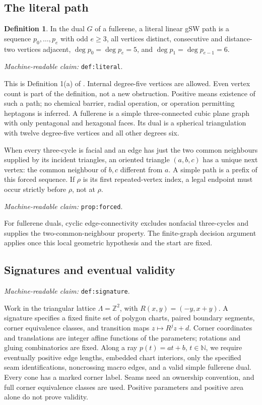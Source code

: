 \documentclass[11pt]{amsart}
\newcommand{\Z}{\mathbb Z}
\newcommand{\N}{\mathbb N}
\newcommand{\record}[1]{\nolinkurl{#1}}
\newcommand{\claimid}[1]{\par\nopagebreak\noindent\textit{Machine-readable claim:} \record{#1}.\par}
\theoremstyle{definition}\newtheorem{definition}{Definition}
\begin{document}
\subsection{The literal path}
\begin{definition}\label{def:literal}
In the dual $G$ of a fullerene, a literal linear gSW path is a sequence
$p_0,\ldots,p_e$ with odd $e\ge3$, all vertices distinct, consecutive
and distance-two vertices adjacent, $\deg p_0=\deg p_e=5$, and
$\deg p_1=\deg p_{e-1}=6$.
\end{definition}
\claimid{def:literal}
This is Definition 1(a) of \cite{BBS}. Internal degree-five vertices
are allowed. Even vertex count is part of the definition, not a new
obstruction. Positive means existence of such a path; no chemical
barrier, radial operation, or operation permitting heptagons is inferred.
A fullerene is a simple three-connected cubic plane graph with only
pentagonal and hexagonal faces. Its dual is a spherical triangulation
with twelve degree-five vertices and all other degrees six.

When every three-cycle is facial and an edge has just the two common
neighbours supplied by its incident triangles, an oriented triangle
$(a,b,c)$ has a unique next vertex: the common neighbour of $b,c$
different from $a$. A simple path is a prefix of this forced sequence.
If $\rho$ is its first repeated-vertex index, a legal endpoint must
occur strictly before $\rho$, not at $\rho$.
\label{prop:forced}\claimid{prop:forced}
For fullerene duals, cyclic edge-connectivity
\cite{Connectivity} excludes nonfacial three-cycles and supplies the
two-common-neighbour property. The finite-graph decision argument
applies once this local geometric hypothesis and the start are fixed.

\subsection{Signatures and eventual validity}\label{def:signature}
\claimid{def:signature}
Work in the triangular lattice $\Lambda=\Z^2$, with
$R(x,y)=(-y,x+y)$. A signature specifies a fixed finite set of polygon
charts, paired boundary segments, corner equivalence classes, and
transition maps $z\mapsto R^jz+d$. Corner coordinates and translations
are integer affine functions of the parameters; rotations and gluing
combinatorics are fixed. Along a ray $p(t)=at+b$, $t\in\N$, we require
eventually positive edge lengths, embedded chart interiors, only the
specified seam identifications, noncrossing macro edges, and a valid
simple fullerene dual. Every cone has a marked corner label. Seams
need an ownership convention, and full corner equivalence classes are
used. Positive parameters and positive area alone do not prove validity.
\end{document}
